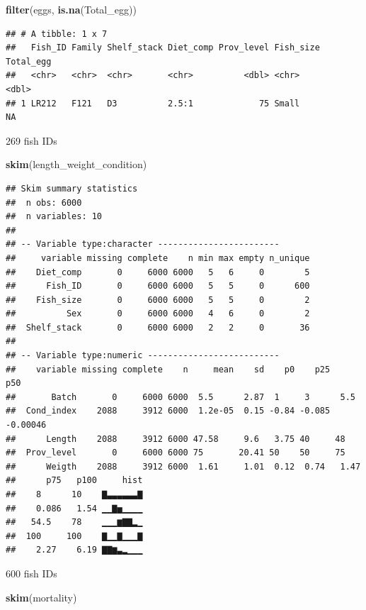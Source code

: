 \documentclass[]{book}
\newenvironment{Shaded}{\begin{snugshade}}{\end{snugshade}}
\newcommand{\KeywordTok}[1]{\textcolor[rgb]{0.13,0.29,0.53}{\textbf{#1}}}
\newcommand{\NormalTok}[1]{#1}
\begin{document}
\begin{Shaded}
\begin{Highlighting}[]
\KeywordTok{filter}\NormalTok{(eggs, }\KeywordTok{is.na}\NormalTok{(Total_egg))}
\end{Highlighting}
\end{Shaded}

\begin{verbatim}
## # A tibble: 1 x 7
##   Fish_ID Family Shelf_stack Diet_comp Prov_level Fish_size Total_egg
##   <chr>   <chr>  <chr>       <chr>          <dbl> <chr>         <dbl>
## 1 LR212   F121   D3          2.5:1             75 Small            NA
\end{verbatim}

269 fish IDs

\begin{Shaded}
\begin{Highlighting}[]
\KeywordTok{skim}\NormalTok{(length_weight_condition)}
\end{Highlighting}
\end{Shaded}

\begin{verbatim}
## Skim summary statistics
##  n obs: 6000 
##  n variables: 10 
## 
## -- Variable type:character ------------------------
##     variable missing complete    n min max empty n_unique
##    Diet_comp       0     6000 6000   5   6     0        5
##      Fish_ID       0     6000 6000   5   5     0      600
##    Fish_size       0     6000 6000   5   5     0        2
##          Sex       0     6000 6000   4   6     0        2
##  Shelf_stack       0     6000 6000   2   2     0       36
## 
## -- Variable type:numeric --------------------------
##    variable missing complete    n     mean    sd    p0    p25      p50
##       Batch       0     6000 6000  5.5      2.87  1     3      5.5    
##  Cond_index    2088     3912 6000  1.2e-05  0.15 -0.84 -0.085 -0.00046
##      Length    2088     3912 6000 47.58     9.6   3.75 40     48      
##  Prov_level       0     6000 6000 75       20.41 50    50     75      
##      Weigth    2088     3912 6000  1.61     1.01  0.12  0.74   1.47   
##      p75   p100     hist
##    8      10    ▇▃▃▃▃▃▃▇
##    0.086   1.54 ▁▁▇▅▁▁▁▁
##   54.5    78    ▁▁▁▆▇▇▂▁
##  100     100    ▇▁▁▇▁▁▁▇
##    2.27    6.19 ▇▇▆▃▂▁▁▁
\end{verbatim}

600 fish IDs

\begin{Shaded}
\begin{Highlighting}[]
\KeywordTok{skim}\NormalTok{(mortality)}
\end{Highlighting}
\end{Shaded}
\end{document}
